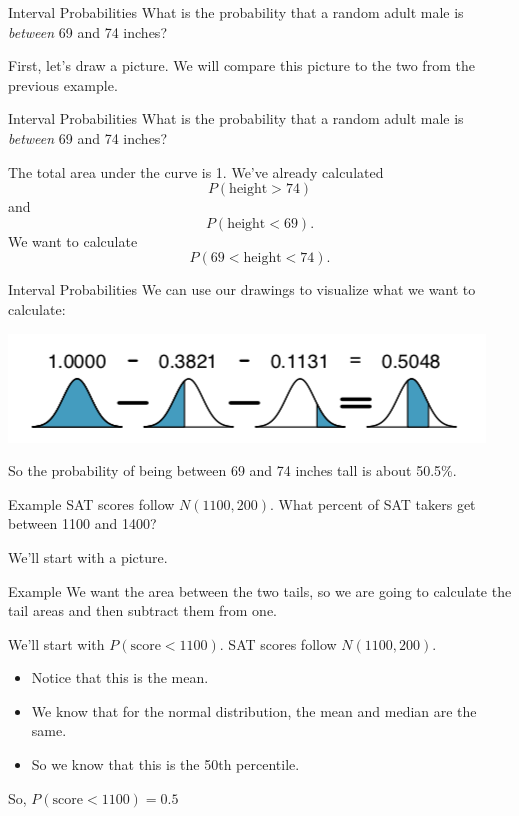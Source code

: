 \begin{frame}{Interval Probabilities}
    What is the probability that a random adult male is \textit{between} 69 and 74 inches?
    
    \vspace{12pt}First, let's draw a picture. We will compare this picture to the two from the previous example.
\end{frame}

\begin{frame}{Interval Probabilities}
    What is the probability that a random adult male is \textit{between} 69 and 74 inches?
    
    \vspace{12pt}The total area under the curve is 1. We've already calculated
    \[
        P(\text{height} > 74)
    \]
    and 
    \[
        P(\text{height} < 69).
    \]
    We want to calculate
    \[
        P( 69 < \text{height} < 74).
    \]
\end{frame}

\begin{frame}{Interval Probabilities}
    We can use our drawings to visualize what we want to calculate:
    \begin{center}
        \includegraphics[scale=0.6]{images/intprob.png}
    \end{center}
    So the probability of being between 69 and 74 inches tall is about 50.5\%.
\end{frame}

\begin{frame}{Example}
    SAT scores follow $N(1100,200)$. What percent of SAT takers get between 1100 and 1400?
    
    \vspace{12pt}We'll start with a picture.
\end{frame}

\begin{frame}{Example}
    We want the area between the two tails, so we are going to calculate the tail areas and then subtract them from one.
    
    \vspace{12pt}We'll start with $P(\text{score}<1100)$. SAT scores follow $N(1100,200)$.
    \begin{itemize}
        \item Notice that this is the mean.
        \item We know that for the normal distribution, the mean and median are the same.
        \item So we know that this is the 50th percentile.
    \end{itemize}
    So, $P(\text{score}<1100)=0.5$
\end{frame}

